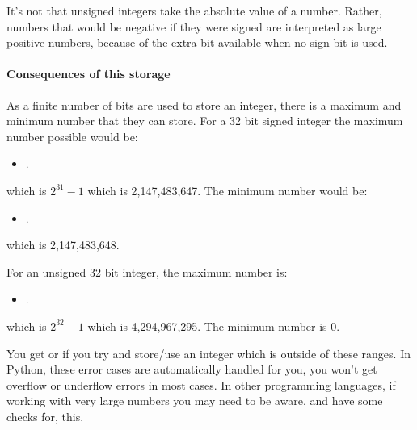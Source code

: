\documentclass[letterpaper,10pt,british]{sphinxmanual}
\begin{document}
\sphinxAtStartPar
It’s not that unsigned integers take the absolute value of a number. Rather, numbers that would be negative if they were signed are interpreted as large positive numbers, because of the extra bit available when no sign bit is used.


\paragraph{Consequences of this storage}
\label{\detokenize{chapters/programming_fundamentals/integers:consequences-of-this-storage}}
\sphinxAtStartPar
As a finite number of bits are used to store an integer, there is a maximum and minimum number that they can store. For a 32 bit signed integer the maximum number possible would be:
\begin{itemize}
\item {} 
\sphinxAtStartPar
{}.

\end{itemize}

\sphinxAtStartPar
which is \(2^{31} -1\) which is 2,147,483,647. The minimum number would be:
\begin{itemize}
\item {} 
\sphinxAtStartPar
{}.

\end{itemize}

\sphinxAtStartPar
which is \sphinxhyphen{}2,147,483,648.

\sphinxAtStartPar
For an unsigned 32 bit integer, the maximum number is:
\begin{itemize}
\item {} 
\sphinxAtStartPar
{}.

\end{itemize}

\sphinxAtStartPar
which is \(2^{32} -1\) which is 4,294,967,295. The minimum number is 0.

\sphinxAtStartPar
You get  or  if you try and store/use an integer which is outside of these ranges. In Python, these error cases are automatically handled for you, you won’t get overflow or underflow errors in most cases. In other programming languages, if working with very large numbers you may need to be aware, and have some checks for, this.
\end{document}
